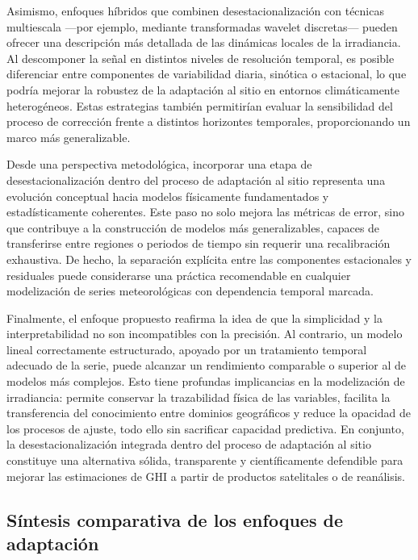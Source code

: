Asimismo, enfoques híbridos que combinen desestacionalización con técnicas multiescala —por ejemplo, mediante transformadas wavelet discretas— pueden ofrecer una descripción más detallada de las dinámicas locales de la irradiancia. Al descomponer la señal en distintos niveles de resolución temporal, es posible diferenciar entre componentes de variabilidad diaria, sinótica o estacional, lo que podría mejorar la robustez de la adaptación al sitio en entornos climáticamente heterogéneos. Estas estrategias también permitirían evaluar la sensibilidad del proceso de corrección frente a distintos horizontes temporales, proporcionando un marco más generalizable.

Desde una perspectiva metodológica, incorporar una etapa de desestacionalización dentro del proceso de adaptación al sitio representa una evolución conceptual hacia modelos físicamente fundamentados y estadísticamente coherentes. Este paso no solo mejora las métricas de error, sino que contribuye a la construcción de modelos más generalizables, capaces de transferirse entre regiones o periodos de tiempo sin requerir una recalibración exhaustiva. De hecho, la separación explícita entre las componentes estacionales y residuales puede considerarse una práctica recomendable en cualquier modelización de series meteorológicas con dependencia temporal marcada.

Finalmente, el enfoque propuesto reafirma la idea de que la simplicidad y la interpretabilidad no son incompatibles con la precisión. Al contrario, un modelo lineal correctamente estructurado, apoyado por un tratamiento temporal adecuado de la serie, puede alcanzar un rendimiento comparable o superior al de modelos más complejos. Esto tiene profundas implicancias en la modelización de irradiancia: permite conservar la trazabilidad física de las variables, facilita la transferencia del conocimiento entre dominios geográficos y reduce la opacidad de los procesos de ajuste, todo ello sin sacrificar capacidad predictiva. En conjunto, la desestacionalización integrada dentro del proceso de adaptación al sitio constituye una alternativa sólida, transparente y científicamente defendible para mejorar las estimaciones de GHI a partir de productos satelitales o de reanálisis.


\subsection{Síntesis comparativa de los enfoques de adaptación}\label{subsec:sintesis-enfoques}

